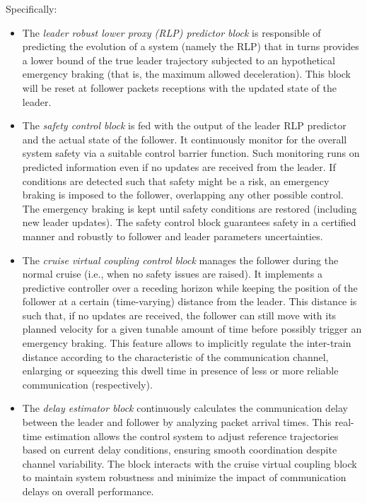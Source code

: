 \documentclass[letterpaper, 10 pt, conference]{ieeeconf}
\theoremstyle{definition}
\theoremstyle{nopoint}
\newcommand{\red}[1]{%
	{\color{red}{#1}}%
}
\begin{document}
Specifically:
\begin{itemize}
\item The {\em leader robust lower proxy (RLP) predictor block} is responsible of predicting the evolution of a system (namely the RLP) that in turns provides a lower bound of the true leader trajectory subjected to an hypothetical emergency braking (that is, the maximum allowed deceleration). 
This block will be reset at follower packets receptions with the updated state of the leader. 
\item The {\em safety control block} is fed with the output of the leader RLP predictor and the actual state of the follower. It continuously monitor for the overall system safety via a suitable control barrier function. Such monitoring runs on predicted information even if no updates are received from the leader. If conditions are detected such that safety might be a risk, an emergency braking is imposed to the follower, overlapping any other possible control. The emergency braking is kept until safety conditions are restored (including new leader updates). The safety control block guarantees safety in a certified manner and robustly to follower and leader parameters uncertainties.
\item The {\em cruise virtual coupling control block} manages the follower during the normal cruise (i.e., when no safety issues are raised). It implements a predictive controller over a receding horizon while keeping the position of the follower at a certain (time-varying) distance from the leader. This distance is such that, if no updates are received, the follower can still move with its planned velocity for a given tunable amount of time before possibly trigger an emergency braking. 
This feature allows to implicitly regulate the inter-train distance according to the characteristic of the communication channel, enlarging or squeezing this dwell time in presence of less or more reliable communication (respectively). 

\item The {\em  delay estimator block} continuously calculates the communication delay between the leader and follower by analyzing packet arrival times. This real-time estimation allows the control system to adjust reference trajectories based on current delay conditions, ensuring smooth coordination despite channel variability. The block interacts with the cruise virtual coupling block to maintain system robustness and minimize the impact of communication delays on overall performance. \red{AGGIUSTA}
\end{itemize} 
\end{document}
